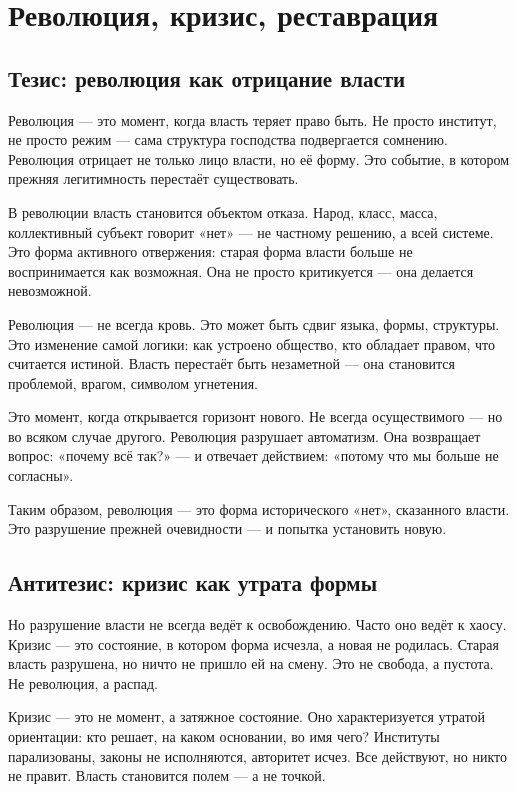 \chapter{Революция, кризис, реставрация}

\section{Тезис: революция как отрицание власти}

Революция — это момент, когда власть теряет право быть. Не просто институт, не просто режим — сама структура господства подвергается сомнению. Революция отрицает не только лицо власти, но её форму. Это событие, в котором прежняя легитимность перестаёт существовать.

В революции власть становится объектом отказа. Народ, класс, масса, коллективный субъект говорит «нет» — не частному решению, а всей системе. Это форма активного отвержения: старая форма власти больше не воспринимается как возможная. Она не просто критикуется — она делается невозможной.

Революция — не всегда кровь. Это может быть сдвиг языка, формы, структуры. Это изменение самой логики: как устроено общество, кто обладает правом, что считается истиной. Власть перестаёт быть незаметной — она становится проблемой, врагом, символом угнетения.

Это момент, когда открывается горизонт нового. Не всегда осуществимого — но во всяком случае другого. Революция разрушает автоматизм. Она возвращает вопрос: «почему всё так?» — и отвечает действием: «потому что мы больше не согласны».

Таким образом, революция — это форма исторического «нет», сказанного власти. Это разрушение прежней очевидности — и попытка установить новую.

\section{Антитезис: кризис как утрата формы}

Но разрушение власти не всегда ведёт к освобождению. Часто оно ведёт к хаосу. Кризис — это состояние, в котором форма исчезла, а новая не родилась. Старая власть разрушена, но ничто не пришло ей на смену. Это не свобода, а пустота. Не революция, а распад.

Кризис — это не момент, а затяжное состояние. Оно характеризуется утратой ориентации: кто решает, на каком основании, во имя чего? Институты парализованы, законы не исполняются, авторитет исчез. Все действуют, но никто не правит. Власть становится полем — а не точкой.

